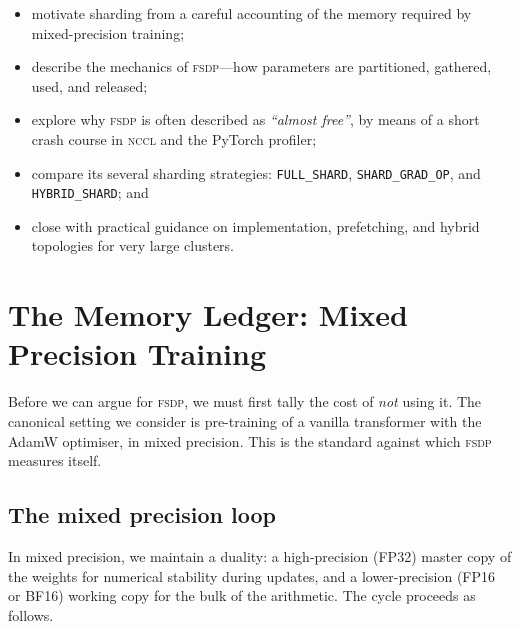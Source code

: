 \documentclass[11pt,a4paper]{article}
\theoremstyle{definition}
\theoremstyle{remark}
\newcommand{\FSDP}{\textsc{fsdp}}
\newcommand{\NCCL}{\textsc{nccl}}
\begin{document}
\begin{itemize}[leftmargin=*, itemsep=0.1em]
    \item motivate sharding from a careful accounting of the memory required by mixed-precision training;
    \item describe the mechanics of \FSDP{}---how parameters are partitioned, gathered, used, and released;
    \item explore why \FSDP{} is often described as \emph{``almost free''}, by means of a short crash course in \NCCL{} and the PyTorch profiler;
    \item compare its several sharding strategies: \texttt{FULL\_SHARD}, \texttt{SHARD\_GRAD\_OP}, and \texttt{HYBRID\_SHARD}; and
    \item close with practical guidance on implementation, prefetching, and hybrid topologies for very large clusters.
\end{itemize}

\section{The Memory Ledger: Mixed Precision Training}


Before we can argue for \FSDP{}, we must first tally the cost of \emph{not} using it. The canonical setting we consider is pre-training of a vanilla transformer with the AdamW optimiser, in mixed precision. This is the standard against which \FSDP{} measures itself.

\subsection{The mixed precision loop}

In mixed precision, we maintain a duality: a high-precision (\textsc{FP32}) master copy of the weights for numerical stability during updates, and a lower-precision (\textsc{FP16} or \textsc{BF16}) working copy for the bulk of the arithmetic. The cycle proceeds as follows.
\end{document}
